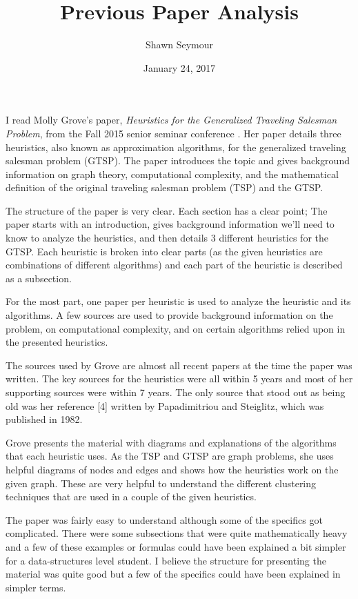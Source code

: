 \documentclass[12pt,letterpaper]{article}
\title{Previous Paper Analysis}
\date{January 24, 2017}
\author{Shawn Seymour}
\begin{document}
\maketitle

I read Molly Grove's paper, \emph{Heuristics for the Generalized Traveling Salesman Problem}, from the Fall 2015 senior seminar conference \cite{grove}. Her paper details three heuristics, also known as approximation algorithms, for the generalized traveling salesman problem (GTSP). The paper introduces the topic and gives background information on graph theory, computational complexity, and the mathematical definition of the original traveling salesman problem (TSP) and the GTSP.

The structure of the paper is very clear. Each section has a clear point; The paper starts with an introduction, gives background information we'll need to know to analyze the heuristics, and then details 3 different heuristics for the GTSP. Each heuristic is broken into clear parts (as the given heuristics are combinations of different algorithms) and each part of the heuristic is described as a subsection.

For the most part, one paper per heuristic is used to analyze the heuristic and its algorithms. A few sources are used to provide background information on the problem, on computational complexity, and on certain algorithms relied upon in the presented heuristics.

The sources used by Grove are almost all recent papers at the time the paper was written. The key sources for the heuristics were all within 5 years and most of her supporting sources were within 7 years. The only source that stood out as being old was her reference [4] written by Papadimitriou and Steiglitz, which was published in 1982.

Grove presents the material with diagrams and explanations of the algorithms that each heuristic uses. As the TSP and GTSP are graph problems, she uses helpful diagrams of nodes and edges and shows how the heuristics work on the given graph. These are very helpful to understand the different clustering techniques that are used in a couple of the given heuristics.

The paper was fairly easy to understand although some of the specifics got complicated. There were some subsections that were quite mathematically heavy and a few of these examples or formulas could have been explained a bit simpler for a data-structures level student. I believe the structure for presenting the material was quite good but a few of the specifics could have been explained in simpler terms.
\end{document}
